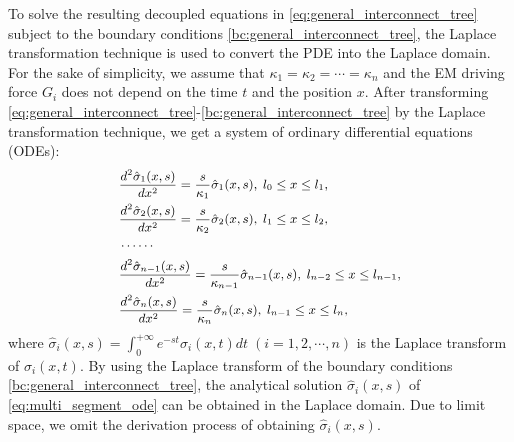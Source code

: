  To solve the resulting decoupled equations in
 \eqref{eq:general_interconnect_tree} subject to the boundary
 conditions \eqref{bc:general_interconnect_tree}, the Laplace
 transformation technique is used to convert the PDE into the Laplace
 domain. For the sake of simplicity, we assume that
 $\kappa_1=\kappa_2=\cdots=\kappa_n$ and the EM driving force $G_i$ does not
 depend on the time $t$ and the position $x$. After transforming
 \eqref{eq:general_interconnect_tree}-\eqref{bc:general_interconnect_tree}
 by the Laplace transformation technique, we get a system of ordinary
 differential equations (ODEs):
  \begin{equation} \label{eq:multi_segment_ode}\small
\begin{split}
&\frac{d^2\hat{\sigma}_1(x,s)}{dx^2}=\frac{s}{\kappa_1}\hat{\sigma}_1(x,s),\;l_0\leq x\leq l_1,\\
&\frac{d^2\hat{\sigma}_2(x,s)}{dx^2}=\frac{s}{\kappa_2}\hat{\sigma}_2(x,s),\;l_1\leq x\leq l_2,\\
&\cdots\cdots\\
&\frac{d^2\hat{\sigma}_{n-1}(x,s)}{dx^2}=\frac{s}{\kappa_{n-1}}\hat{\sigma}_{n-1}(x,s),\;l_{n-2}\leq x\leq l_{n-1},\\
&\frac{d^2\hat{\sigma}_{n}(x,s)}{dx^2}=\frac{s}{\kappa_{n}}\hat{\sigma}_{n}(x,s),\;l_{n-1}\leq x\leq l_{n},
 \end{split}
 \end{equation} 
where $\hat{\sigma}_{i}(x,s)=\int_0^{+\infty}e^{-st}\sigma_{i}(x,t)dt\;(i=1,2,\cdots,n)$ is the Laplace transform of $\sigma_{i}(x,t)$.
By using the Laplace transform of the boundary conditions \eqref{bc:general_interconnect_tree}, 
the analytical solution $\hat{\sigma}_{i}(x,s)$ of \eqref{eq:multi_segment_ode} can be obtained in the Laplace domain. Due to limit space,
we omit the derivation process of obtaining $\hat{\sigma}_{i}(x,s)$. 

